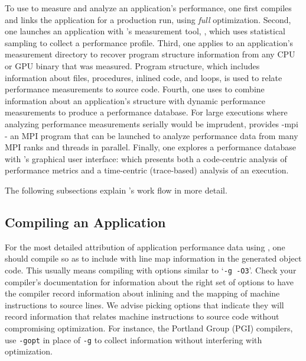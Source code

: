 \documentclass[11pt,twoside,letterpaper]{report}
\begin{document}
To use \HPCToolkit{} to measure and analyze an application's performance, one first compiles and links the application for a production run, using \emph{full} optimization.
Second, one launches an application with \HPCToolkit{}'s measurement tool, \hpcrun{}, which uses statistical sampling to collect a performance profile.
Third, one applies \hpcstruct{} to an application's measurement directory to recover program structure information from any CPU or GPU binary that was measured.
Program structure, which includes information about files, procedures, inlined code, and loops, is used to relate performance measurements to source code.
Fourth, one uses \hpcprof{} to combine information about an application's structure with dynamic performance measurements to produce a performance database.
For large executions where analyzing performance measurements serially would be imprudent, \HPCToolkit{}  provides \hpcprof-mpi{} - an MPI program that can be launched to analyze  performance data from many MPI ranks and threads in parallel.
Finally, one explores a performance database with \HPCToolkit{}'s graphical user interface: \hpcviewer{} which presents
both a code-centric analysis of performance metrics and a time-centric (trace-based) analysis of an execution.

The following subsections explain \HPCToolkit{}'s work flow in more detail.



\subsection{Compiling an Application}

For the most detailed attribution of application performance data using \HPCToolkit{}, one should compile so as to include with line map information in the generated object code.
This usually means compiling with options similar to `\texttt{-g -O3}'. Check your compiler's documentation for information about the right set of options to have the compiler record information about inlining and the mapping of machine instructions to source lines. We advise picking  options that indicate they will record information that relates machine instructions to source code without compromising optimization. For instance, the Portland Group (PGI) compilers, use \texttt{-gopt} in place of \texttt{-g} to collect information without interfering with optimization.
\end{document}
